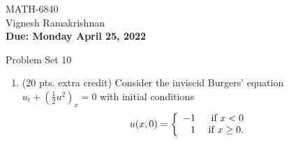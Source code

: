 \documentclass[11pt]{article}
\begin{document}
\begin{flushright}
\small{MATH-6840\\
Vignesh Ramakrishnan\\
{\bf Due: Monday April 25, 2022}}
\end{flushright}

\begin{center}
\large{Problem Set 10}\\
\end{center}

\begin{enumerate}
  \item {\color{red}(20 pts. extra credit) Consider the inviscid Burgers' equation $u_t+\left(\frac{1}{2}u^2\right)_x=0$ with initial conditions}
  \begin{align*}
    u(x,0) = \left\{\begin{array}{rr}
    -1 & \hbox{ if } x<0 \\
    1 & \hbox{ if } x \ge 0.
    \end{array}
    \right.
  \end{align*}
  

\end{enumerate}
\end{document}
